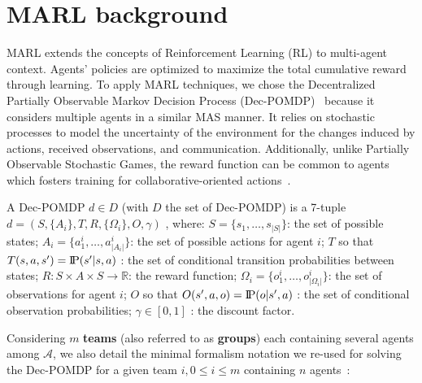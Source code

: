 \documentclass[sigconf,anonymous]{aamas}
\newcommand{\probP}{\text{I\kern-0.15em P}}
\begin{document}
\section{MARL background}\label{sec:marl_background}

MARL extends the concepts of Reinforcement Learning (RL) to multi-agent context. Agents' policies are optimized to maximize the total cumulative reward through learning.
To apply MARL techniques, we chose the Decentralized Partially Observable Markov Decision Process (Dec-POMDP)~\cite{Oliehoek2016} because it considers multiple agents in a similar MAS manner. It relies on stochastic processes to model the uncertainty of the environment for the changes induced by actions, received observations, and communication. Additionally, unlike Partially Observable Stochastic Games, the reward function can be common to agents which fosters training for collaborative-oriented actions~\cite{Beynier2013}.

A Dec-POMDP $d \in D$ (with $D$ the set of Dec-POMDP) is a 7-tuple $d = (S,\{A_i\},T,R,\{\Omega_i\},O,\gamma)$ , where:
$S = \{s_1,\dots,s_{|S|}\}$: the set of possible states;
$A_{i} = \{a_{1}^{i},\dots,a_{|A_{i}|}^{i}\}$: the set of possible actions for agent $i$;
$T$ so that $T(s,a,s') = \probP{(s'|s,a)}$ : the set of conditional transition probabilities between states;
$R: S \times A \times S \rightarrow \mathbb{R}$: the reward function;
$\Omega_{i} = \{o_{1}^{i},\dots,o_{|\Omega_{i}|}^{i}\}$: the set of observations for agent $i$;
$O$ so that $O(s',a,o) = \probP{(o|s',a)}$ : the set of conditional observation probabilities;
$\gamma \in [0,1]$ : the discount factor.

Considering $m$ \textbf{teams} (also referred to as \textbf{groups}) each containing several agents among $\mathcal{A}$, we also detail the minimal formalism notation we re-used for solving the Dec-POMDP for a given team $i, 0 \leq i \leq m$ containing $n$ agents~\cite{Beynier2013,Albrecht2024}:
\end{document}
